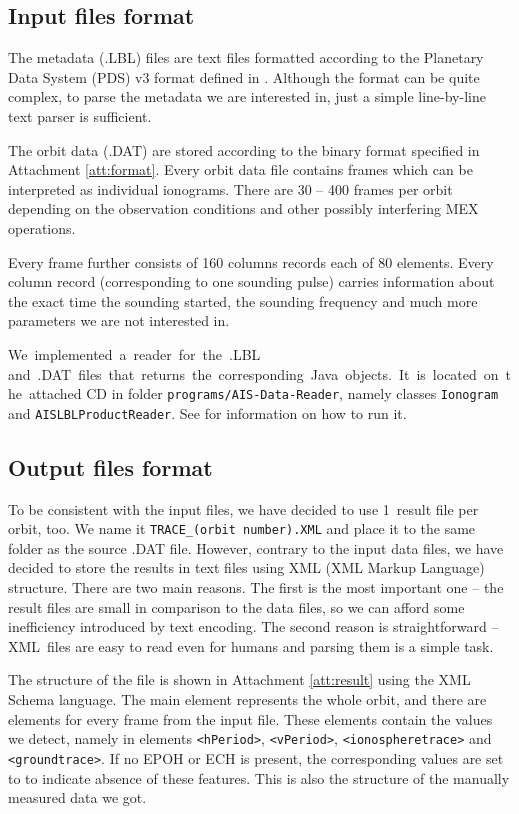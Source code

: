 \subsection{Input files format}
The metadata (.LBL) files are text files formatted according to the Planetary Data System (PDS) v3 format defined in \citep{JPL2009}. Although the format can be quite complex, to parse the metadata we are interested in, just a simple line-by-line text parser is sufficient.

The orbit data (.DAT) are stored according to the binary format specified in Attachment \ref{att:format}. Every orbit data file contains frames which can be interpreted as individual ionograms. There are 30 -- 400 frames per orbit depending on the observation conditions and other possibly interfering MEX operations. 

Every frame further consists of 160 columns records each of 80 elements. Every column record (corresponding to one sounding pulse) carries information about the exact time the sounding started, the sounding frequency and much more parameters we are not interested in.

We~implemented~a~reader~for~the~.LBL and~.DAT~files~that~re\-turns~the~corresponding~Java~objects.~It~is~located~on~the~attached CD in folder \texttt{programs/AIS-Data-Reader}, namely classes \texttt{Ionogram} and \texttt{AISLBLProductReader}. See  for information on how to run it.

\subsection{Output files format}
To be consistent with the input files, we have decided to use 1~result file per orbit, too. We name it \texttt{TRACE\_(orbit number).XML} and place it to the same folder as the source .DAT file. However, contrary to the input data files, we have decided to store the results in text files using XML (XML Markup Language) structure. There are two main reasons. The first is the most important one -- the result files are small in comparison to the data files, so we can afford some inefficiency introduced by text encoding. The second reason is straightforward -- XML~files are easy to read even for humans and parsing them is a simple task.

The structure of the file is shown in Attachment \ref{att:result} using the XML Schema language. The main element represents the whole orbit, and there are elements for every frame from the input file. These elements contain the values we detect, namely in elements \texttt{<hPeriod>}, \texttt{<vPeriod>}, \texttt{<ionospheretrace>} and \texttt{<groundtrace>}. If no EPOH or ECH is present, the corresponding values are set to  to indicate absence of these features. This is also the structure of the manually measured data we got.

